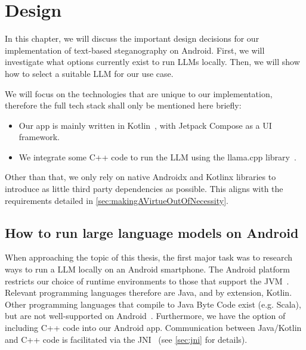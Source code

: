 
\chapter{Design}\label{ch:design}
\glsresetall %

In this chapter, we will discuss the important design decisions for our implementation of text-based steganography on Android. First, we will investigate what options currently exist to run \glspl{LLM} locally. Then, we will show how to select a suitable \gls{LLM} for our use case.

We will focus on the technologies that are unique to our implementation, therefore the full tech stack shall only be mentioned here briefly:
\begin{itemize}
	\item Our app is mainly written in Kotlin~\cite{kotlinKotlinProgrammingLanguage}, with Jetpack Compose as a \gls{UI} framework.
	\item We integrate some C++ code to run the \gls{LLM} using the llama.cpp library~\cite{gerganovGgerganovLlamacpp2024}.
\end{itemize}

Other than that, we only rely on native Androidx and Kotlinx libraries to introduce as little third party dependencies as possible. This aligns with the requirements detailed in \cref{sec:makingAVirtueOutOfNecessity}.

\section{How to run large language models on Android}
\label{sec:howToRunLLMsOnAndroid}
When approaching the topic of this thesis, the first major task was to research ways to run a \gls{LLM} locally on an Android smartphone. The Android platform restricts our choice of runtime environments to those that support the \gls{JVM}~\cite{ruggiaDarkSideNative2025}. Relevant programming languages therefore are Java, and by extension, Kotlin. Other programming languages that compile to Java Byte Code exist (e.g. Scala), but are not well-supported on Android~\cite{ruggiaDarkSideNative2025}. Furthermore, we have the option of including C++ code into our Android app. Communication between Java/Kotlin and C++ code is facilitated via the \gls{JNI}~\cite{ruggiaDarkSideNative2025} (see \cref{sec:jni} for details).

